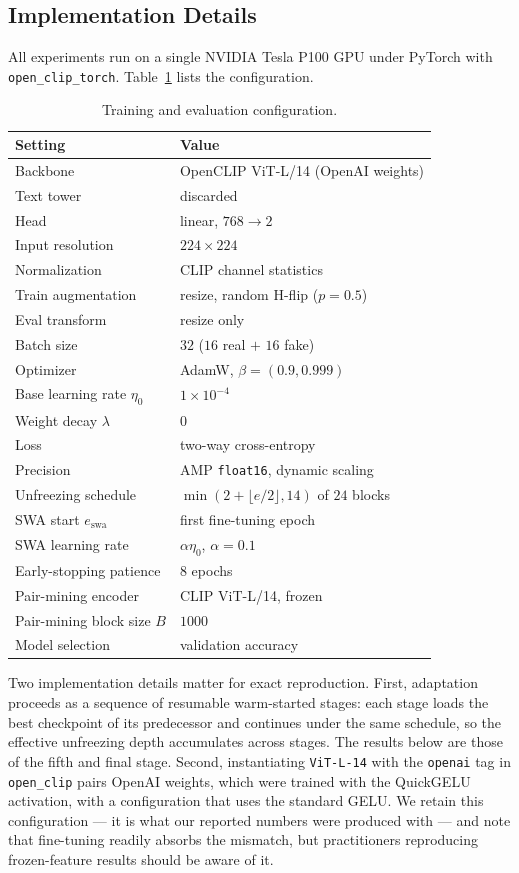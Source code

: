 \documentclass[10pt,journal]{IEEEtran}
\begin{document}
\subsection{Implementation Details}
All experiments run on a single NVIDIA Tesla P100 GPU under PyTorch with
\texttt{open\_clip\_torch}. Table~\ref{tab:hyper} lists the configuration.

\begin{table}[!t]
\caption{Training and evaluation configuration.}
\label{tab:hyper}
\centering
\footnotesize
\begin{tabular}{@{}ll@{}}
\toprule
Setting & Value \\
\midrule
Backbone & OpenCLIP ViT-L/14 (OpenAI weights) \\
Text tower & discarded \\
Head & linear, $768\to2$ \\
Input resolution & $224\times224$ \\
Normalization & CLIP channel statistics \\
Train augmentation & resize, random H-flip ($p{=}0.5$) \\
Eval transform & resize only \\
Batch size & $32$ ($16$ real $+$ $16$ fake) \\
Optimizer & AdamW, $\beta=(0.9,0.999)$ \\
Base learning rate $\eta_0$ & $1\times10^{-4}$ \\
Weight decay $\lambda$ & $0$ \\
Loss & two-way cross-entropy \\
Precision & AMP \texttt{float16}, dynamic scaling \\
Unfreezing schedule & $\min(2+\lfloor e/2\rfloor,14)$ of $24$ blocks \\
SWA start $e_{\mathrm{swa}}$ & first fine-tuning epoch \\
SWA learning rate & $\alpha\eta_0$, $\alpha=0.1$ \\
Early-stopping patience & $8$ epochs \\
Pair-mining encoder & CLIP ViT-L/14, frozen \\
Pair-mining block size $B$ & $1000$ \\
Model selection & validation accuracy \\
\bottomrule
\end{tabular}
\end{table}

Two implementation details matter for exact reproduction. First, adaptation
proceeds as a sequence of resumable warm-started stages: each stage loads the
best checkpoint of its predecessor and continues under the same schedule, so
the effective unfreezing depth accumulates across stages. The results below
are those of the fifth and final stage. Second, instantiating
\texttt{ViT-L-14} with the \texttt{openai} tag in \texttt{open\_clip} pairs
OpenAI weights, which were trained with the QuickGELU activation, with a
configuration that uses the standard GELU. We retain this configuration --- it
is what our reported numbers were produced with --- and note that fine-tuning
readily absorbs the mismatch, but practitioners reproducing frozen-feature
results should be aware of it.
\end{document}
